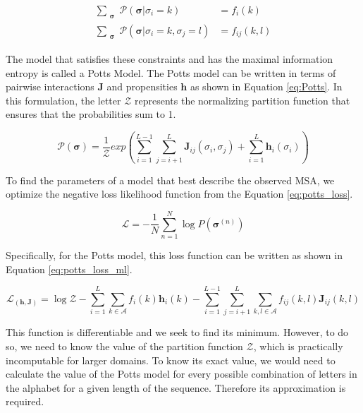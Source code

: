 \begin{equation}
    \begin{split}
        \sum_{\substack{\bm{\sigma}}} \mathcal{P}(\bm{\sigma} | \sigma_i = k) &= f_i(k) \\
        \sum_{\substack{\bm{\sigma}}} \mathcal{P}(\bm{\sigma} | \sigma_i = k, \sigma_j = l) &= f_{ij}(k, l)
    \end{split}
    \label{eq:potts_constraints}
\end{equation}
        
The model that satisfies these constraints and has the maximal information entropy is called a Potts Model.
The Potts model can be written in terms of pairwise interactions $\bm{J}$ and propensities $\bm{h}$ as shown in Equation \ref{eq:Potts}.         
In this formulation, the letter $\mathcal{Z}$ represents the normalizing partition function that ensures that the probabilities sum to 1.
        
\begin{equation}
    \mathcal{P}(\bm{\sigma}) = \frac{1}{\mathcal{Z}} exp\left(\sum_{i = 1}^{L-1} \sum_{j=i+1}^L \bm{J}_{ij}(\sigma_i, \sigma_j) + \sum_{i=1}^L \bm{h}_i({\sigma_i})\right)
    \label{eq:Potts}
\end{equation}
    
To find the parameters of a model that best describe the observed MSA, we optimize the negative loss likelihood function from the Equation \ref{eq:potts_loss}.
        
\begin{equation}
    \mathcal{L} = -\frac{1}{N} \sum_{n=1}^N \log P(\bm{\sigma}^{(n)})
    \label{eq:potts_loss}
\end{equation}
        
Specifically, for the Potts model, this loss function can be written as shown in Equation \ref{eq:potts_loss_ml}. 

\begin{equation}
    \mathcal{L}_(\bm{h}, \bm{J}) = \log \mathcal{Z} - \sum_{i = 1}^L \sum_{k \in \mathcal{A}} f_i(k)\bm{h}_i(k) - \sum_{i = 1}^{L-1} \sum_{j=i+1}^L \sum_{k, l \in \mathcal{A}} f_{ij}(k, l) \bm{J}_{ij}(k, l)
    \label{eq:potts_loss_ml}
\end{equation}

This function is differentiable and we seek to find its minimum. 
However, to do so, we need to know the value of the partition function $\mathcal{Z}$, which is practically incomputable for larger domains. 
To know its exact value, we would need to calculate the value of the Potts model for every possible combination of letters in the alphabet for a given length of the sequence. 
Therefore its approximation is required.
        
